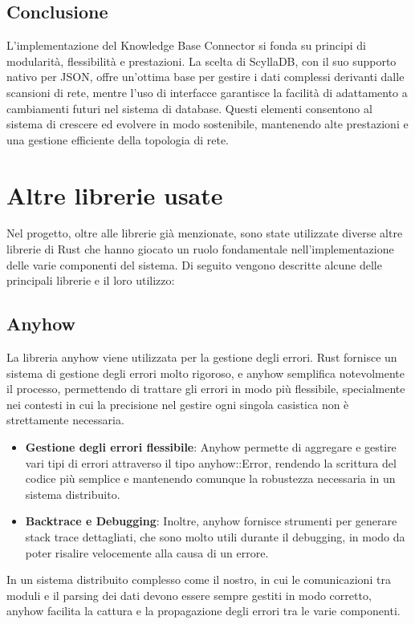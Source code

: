 \documentclass[target=bach,aauheader=,style=]{thud}
\begin{document}
\subsection{Conclusione}
L'implementazione del Knowledge Base Connector si fonda su principi di modularità, flessibilità e prestazioni. La scelta di ScyllaDB, con il suo supporto nativo per JSON, offre un'ottima base per gestire i dati complessi derivanti dalle scansioni di rete, mentre l'uso di interfacce garantisce la facilità di adattamento a cambiamenti futuri nel sistema di database. Questi elementi consentono al sistema di crescere ed evolvere in modo sostenibile, mantenendo alte prestazioni e una gestione efficiente della topologia di rete.


\section{Altre librerie usate}
Nel progetto, oltre alle librerie già menzionate, sono state utilizzate diverse altre librerie di Rust che hanno giocato un ruolo fondamentale nell'implementazione delle varie componenti del sistema. Di seguito vengono descritte alcune delle principali librerie e il loro utilizzo:
\subsection{Anyhow}

La libreria anyhow \cite{rust_anyhow} viene utilizzata per la gestione degli errori. Rust fornisce un sistema di gestione degli errori molto rigoroso, e anyhow semplifica notevolmente il processo, permettendo di trattare gli errori in modo più flessibile, specialmente nei contesti in cui la precisione nel gestire ogni singola casistica non è strettamente necessaria.
\begin{itemize}
  \item \textbf{Gestione degli errori flessibile}: Anyhow permette di aggregare e gestire vari tipi di errori attraverso il tipo anyhow::Error, rendendo la scrittura del codice più semplice e mantenendo comunque la robustezza necessaria in un sistema distribuito.
  \item \textbf{Backtrace e Debugging}: Inoltre, anyhow fornisce strumenti per generare stack trace dettagliati, che sono molto utili durante il debugging, in modo da poter risalire velocemente alla causa di un errore.
\end{itemize}
In un sistema distribuito complesso come il nostro, in cui le comunicazioni tra moduli e il parsing dei dati devono essere sempre gestiti in modo corretto, anyhow facilita la cattura e la propagazione degli errori tra le varie componenti.
\end{document}
